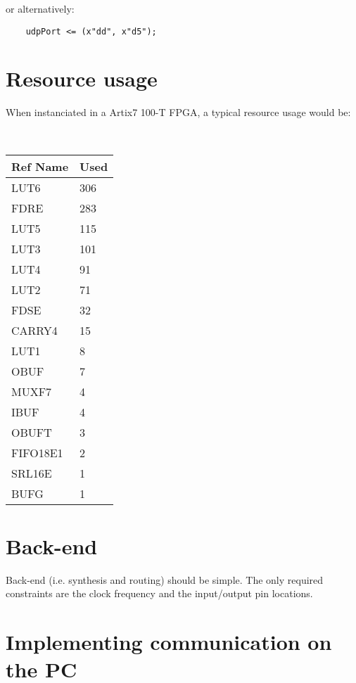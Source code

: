 \documentclass[a4paper]{hitec}
\begin{document}
or alternatively:

\begin{lstlisting}
	udpPort <= (x"dd", x"d5");
\end{lstlisting}



\section{Resource usage}

When instanciated in a Artix7 100-T FPGA, a typical resource usage would be:

\ \\
\begin{center}
	\begin{tabular}{|l|l|}
		\hline
		Ref Name & Used \\
		\hline
		LUT6     &  306 \\
		FDRE     &  283 \\
		LUT5     &  115 \\
		LUT3     &  101 \\
		LUT4     &   91 \\
		LUT2     &   71 \\
		FDSE     &   32 \\
		CARRY4   &   15 \\
		LUT1     &    8 \\
		OBUF     &    7 \\
		MUXF7    &    4 \\
		IBUF     &    4 \\
		OBUFT    &    3 \\
		FIFO18E1 &    2 \\
		SRL16E   &    1 \\
		BUFG     &    1 \\
		\hline
	\end{tabular}
\end{center}



\section{Back-end}

Back-end (i.e. synthesis and routing) should be simple. The only required constraints are the clock frequency and the input/output pin locations.



\section{Implementing communication on the PC}
\end{document}
